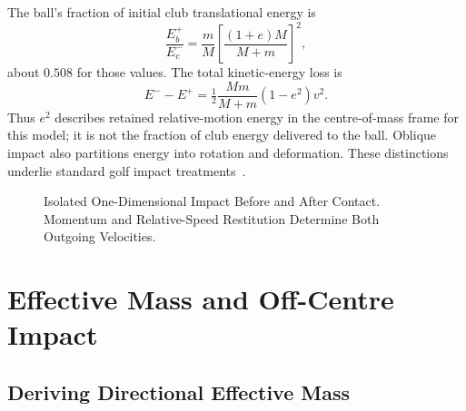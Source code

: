 The ball's fraction of initial club translational energy is
\begin{equation}
\frac{E_b^+}{E_c^-}=\frac{m}{M}
\left[\frac{(1+e)M}{M+m}\right]^2,
\end{equation}
about $0.508$ for those values. The total kinetic-energy loss is
\begin{equation}
E^- - E^+=\tfrac12\frac{Mm}{M+m}(1-e^2)v^2.
\end{equation}
Thus $e^2$ describes retained relative-motion energy in the centre-of-mass
frame for this model; it is not the fraction of club energy delivered to the
ball. Oblique impact also partitions energy into rotation and deformation.
These distinctions underlie standard golf impact treatments~\citep{Jorgensen1994,Penner2003}.

\begin{figure}[htbp]
\centering
{}
\caption{Isolated One-Dimensional Impact Before and After Contact. Momentum and Relative-Speed Restitution Determine Both Outgoing Velocities.}
\label{fig:impact_collision}
\end{figure}

\section{Effective Mass and Off-Centre Impact}
\label{sec:ch28_effective_mass}

\subsection{Deriving Directional Effective Mass}
\label{sec:effective_mass_derivation}

